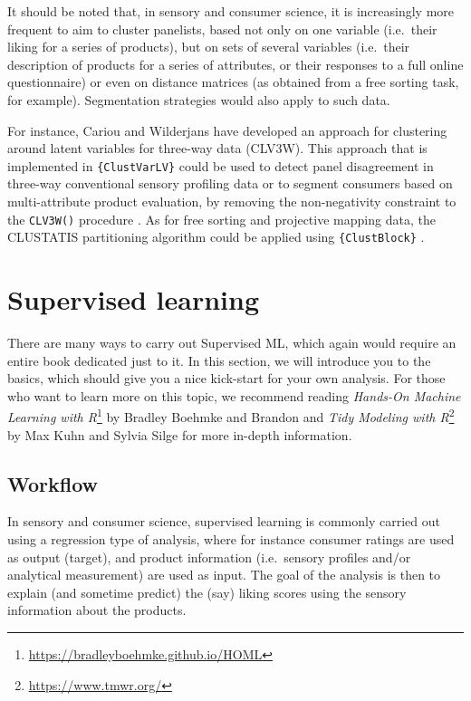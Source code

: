 \documentclass[
]{krantz}
\renewcommand{\href}[2]{#2\footnote{\url{#1}}}
\begin{document}
It should be noted that, in sensory and consumer science, it is increasingly more frequent to aim to cluster panelists, based not only on one variable (i.e.~their liking for a series of products), but on sets of several variables (i.e.~their description of products for a series of attributes, or their responses to a full online questionnaire) or even on distance matrices (as obtained from a free sorting task, for example). Segmentation strategies would also apply to such data.

For instance, Cariou and Wilderjans have developed an approach for clustering around latent variables for three-way data (CLV3W). This approach that is implemented in \texttt{\{ClustVarLV\}} could be used to detect panel disagreement in three-way conventional sensory profiling data \citep{wilderjans2016} or to segment consumers based on multi-attribute product evaluation, by removing the non-negativity constraint to the \texttt{CLV3W()} procedure \citep{cariou2018}. As for free sorting and projective mapping data, the CLUSTATIS partitioning algorithm could be applied using \texttt{\{ClustBlock\}} \citep[\citet{llobell2020}]{llobell2019}.

\hypertarget{supervised-learning}{%
\section{Supervised learning}\label{supervised-learning}}

There are many ways to carry out Supervised ML, which again would require an entire book dedicated just to it. In this section, we will introduce you to the basics, which should give you a nice kick-start for your own analysis. For those who want to learn more on this topic, we recommend reading \href{https://bradleyboehmke.github.io/HOML}{\emph{Hands-On Machine Learning with R}} by Bradley Boehmke and Brandon and \href{https://www.tmwr.org/}{\emph{Tidy Modeling with R}} by Max Kuhn and Sylvia Silge for more in-depth information.

\hypertarget{workflow}{%
\subsection{Workflow}\label{workflow}}

In sensory and consumer science, supervised learning is commonly carried out using a regression type of analysis, where for instance consumer ratings are used as output (target), and product information (i.e.~sensory profiles and/or analytical measurement) are used as input. The goal of the analysis is then to explain (and sometime predict) the (say) liking scores using the sensory information about the products.
\end{document}

